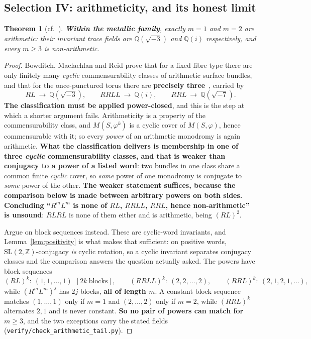 \documentclass[11pt,reqno]{amsart}
\theoremstyle{plain}
\newtheorem{theorem}{Theorem}[section]
\theoremstyle{definition}
\theoremstyle{remark}
\newcommand{\Q}{\mathbb{Q}}
\newcommand{\Z}{\mathbb{Z}}
\newcommand{\SL}{\mathrm{SL}}
\newcommand{\fn}[1]{\texttt{\small #1}}
\begin{document}
\subsection{Selection IV: arithmeticity, and its honest limit}\label{sec:arithmeticity}

\begin{theorem}[cf.~\cite{MaclachlanReid,BMR}]\label{thm:arith}
\textbf{Within the metallic family}, exactly $m=1$ and $m=2$ are arithmetic: their
invariant trace fields are $\Q(\sqrt{-3})$ and $\Q(i)$ respectively, and every $m\ge3$
is non-arithmetic.
\end{theorem}

\begin{proof}
Bowditch, Maclachlan and Reid prove that for a fixed fibre type there are only finitely
many \emph{cyclic} commensurability classes of arithmetic surface bundles, and that for
the once-punctured torus there are \textbf{precisely three}~\cite{BMR}, carried by
\[
   RL\ \to\ \Q(\sqrt{-3}),\qquad RRLL\ \to\ \Q(i),\qquad RRL\ \to\ \Q(\sqrt{-7}).
\]
\textbf{The classification must be applied power-closed}, and this is the step at which a
shorter argument fails. Arithmeticity is a property of the commensurability class, and
$M(S,\varphi^k)$ is a cyclic cover of $M(S,\varphi)$, hence commensurable with it; so
every \emph{power} of an arithmetic monodromy is again arithmetic. \textbf{What the
classification delivers is membership in one of three \emph{cyclic} commensurability
classes, and that is weaker than conjugacy to a power of a listed word}: two bundles in
one class share a common finite \emph{cyclic} cover, so \emph{some} power of one
monodromy is conjugate to \emph{some} power of the other. \textbf{The weaker statement
suffices, because the comparison below is made between arbitrary powers on both sides.} \textbf{Concluding ``$R^mL^m$ is none of $RL$,
$RRLL$, $RRL$, hence non-arithmetic'' is unsound}: $RLRL$ is none of them either and is
arithmetic, being $(RL)^2$.

Argue on block sequences instead. These are cyclic-word invariants, and
Lemma~\ref{lem:positivity} is what makes that sufficient: on positive words,
$\SL(2,\Z)$-conjugacy \emph{is} cyclic rotation, so a cyclic invariant separates
conjugacy classes and the comparison answers the question actually asked. The powers have
block sequences
\[
   (RL)^k:\ (1,1,\dots,1)\ \ [2k\ \text{blocks}],\qquad
   (RRLL)^k:\ (2,2,\dots,2),\qquad
   (RRL)^k:\ (2,1,2,1,\dots),
\]
while $(R^mL^m)^j$ has $2j$ blocks, \textbf{all of length $m$}. A constant block sequence
matches $(1,\dots,1)$ only if $m=1$ and $(2,\dots,2)$ only if $m=2$, while $(RRL)^k$
alternates $2,1$ and is never constant. \textbf{So no pair of powers can match for
$m\ge3$}, and the two exceptions carry the stated fields
(\fn{verify/check\_\allowbreak arithmetic\_\allowbreak tail.py}).
\end{proof}
\end{document}
